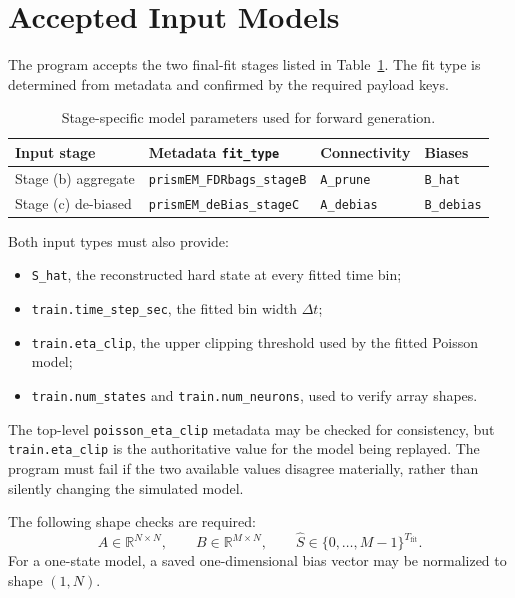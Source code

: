 \documentclass[11pt]{article}
\begin{document}
\section{Accepted Input Models}
\label{sec:input}

The program accepts the two final-fit stages listed in
Table~\ref{tab:model-keys}. The fit type is determined from metadata and
confirmed by the required payload keys.

\begin{table}[ht]
\centering
\begin{tabular}{llll}
\toprule
Input stage & Metadata \texttt{fit\_type} & Connectivity & Biases \\
\midrule
Stage (b) aggregate & \texttt{prismEM\_FDRbags\_stageB}
  & \texttt{A\_prune} & \texttt{B\_hat} \\
Stage (c) de-biased & \texttt{prismEM\_deBias\_stageC}
  & \texttt{A\_debias} & \texttt{B\_debias} \\
\bottomrule
\end{tabular}
\caption{Stage-specific model parameters used for forward generation.}
\label{tab:model-keys}
\end{table}

Both input types must also provide:
\begin{itemize}
  \item \texttt{S\_hat}, the reconstructed hard state at every fitted
        time bin;
  \item \texttt{train.time\_step\_sec}, the fitted bin width
        \(\Delta t\);
  \item \texttt{train.eta\_clip}, the upper clipping threshold used by
        the fitted Poisson model;
  \item \texttt{train.num\_states} and
        \texttt{train.num\_neurons}, used to verify array shapes.
\end{itemize}

The top-level \texttt{poisson\_eta\_clip} metadata may be checked for
consistency, but \texttt{train.eta\_clip} is the authoritative value for
the model being replayed. The program must fail if the two available values
disagree materially, rather than silently changing the simulated model.

The following shape checks are required:
\[
A\in\mathbb{R}^{N\times N},\qquad
B\in\mathbb{R}^{M\times N},\qquad
\hat S\in\{0,\ldots,M-1\}^{T_{\mathrm{fit}}}.
\]
For a one-state model, a saved one-dimensional bias vector may be normalized
to shape \((1,N)\).
\end{document}
